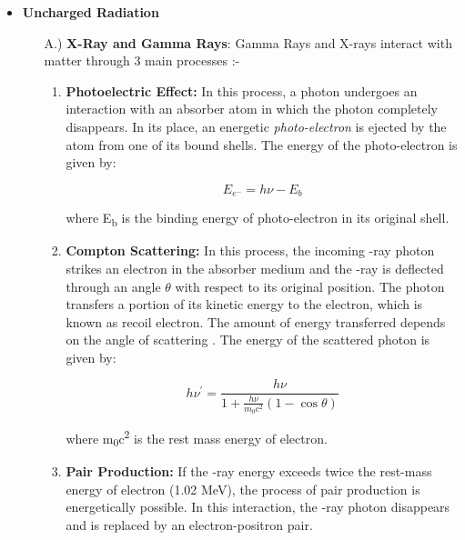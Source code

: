 \documentclass[../../Report.tex]{subfiles}
\begin{document}
    \begin{itemize}
        \item \textbf{Uncharged Radiation} 

        \begin{enumerate}

            \item[A.)] \textbf{X-Ray and Gamma Rays}: Gamma Rays and X-rays interact with matter through 3 main processes :-

            \begin{enumerate}
                \item \textbf{Photoelectric Effect: } In this process, a photon undergoes an interaction with an absorber atom 
                in which the photon completely disappears. In its place, an energetic \textit{photo-electron} is ejected 
                by the atom from one of its bound shells. The energy of the photo-electron is given by:

                $$E_{e^-}=h \nu - E_b $$

                where E\textsubscript{b} is the binding energy of photo-electron in its original shell.

                \item \textbf{Compton Scattering: } In this process, the incoming \textgamma-ray photon strikes an electron 
                in the absorber medium and the \textgamma-ray is deflected through an angle $\theta$ with respect to its original 
                position. The photon transfers a portion of its kinetic energy to the electron, which is known as recoil electron. 
                The amount of energy transferred depends on the angle of scattering \straighttheta. The energy of the 
                scattered photon is given by:

                $$ h\nu^{'}=\frac{h\nu}{1+\frac{h\nu}{m_{0}c^{2}}(1-\cos{\theta})}$$

                where m\textsubscript{0}c\textsuperscript{2}  is the rest mass energy of electron.

                \item \textbf{Pair Production: } If the \textgamma-ray energy exceeds twice the rest-mass energy of electron 
                (1.02 MeV), the process of pair production is energetically possible. In this interaction, the \textgamma-ray 
                photon disappears and is	replaced by an electron-positron pair.
            \end{enumerate}


\end{enumerate}
\end{itemize}
\end{document}
